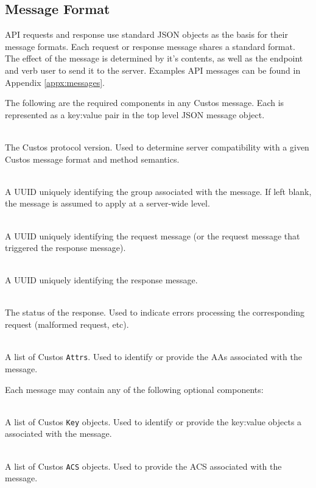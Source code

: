 \subsection{Message Format}

API requests and response use standard JSON objects as the basis for
their message formats. Each request or response message shares a
standard format. The effect of the message is determined by it's
contents, as well as the endpoint and verb user to send it to the
server. Examples API messages can be found in Appendix
\ref{appx:messages}.

The following are the required components in any Custos message. Each
is represented as a key:value pair in the top level JSON message
object.

\begin{packed_desc}
\item[\texttt{Version}] \hfill \\ The Custos protocol version. Used to
  determine server compatibility with a given Custos message format
  and method semantics.
\item[\texttt{Group}] \hfill \\ A UUID uniquely identifying the group
  associated with the message. If left blank, the message is assumed
  to apply at a server-wide level.
\item[\texttt{ReqID}] \hfill \\ A UUID uniquely identifying the
  request message (or the request message that triggered the response
  message).
\item[\texttt{ResID} (Response Only)] \hfill \\ A UUID uniquely
  identifying the response message.
\item[\texttt{Status} (Response Only)] \hfill \\ The status of the
  response. Used to indicate errors processing the corresponding
  request (malformed request, etc).
\item[\texttt{Attrs}] \hfill \\ A list of Custos \texttt{Attrs}. Used
  to identify or provide the AAs associated with the message.
\end{packed_desc}

\noindent
Each message may contain any of the following optional components:

\begin{packed_desc}
\item[\texttt{Keys}] \hfill \\ A list of Custos \texttt{Key}
  objects. Used to identify or provide the key:value objects a
  associated with the message.
\item[\texttt{ACSs}] \hfill \\ A list of Custos \texttt{ACS}
  objects. Used to provide the ACS associated with the message.
\end{packed_desc}

